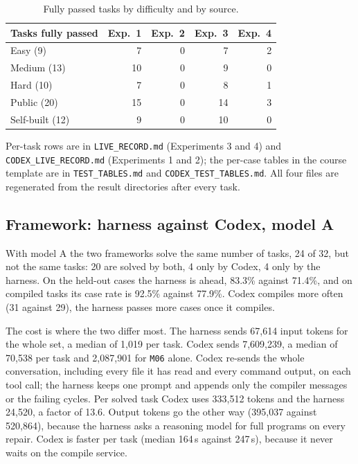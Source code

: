 \begin{table}[h]
\centering
\small
\begin{tabular}{@{}lrrrr@{}}
\toprule
Tasks fully passed & \textbf{Exp.~1} & \textbf{Exp.~2} & \textbf{Exp.~3} & \textbf{Exp.~4} \\
\midrule
Easy (9)       & 7 & 0 & 7 & 2 \\
Medium (13)    & 10 & 0 & 9 & 0 \\
Hard (10)      & 7 & 0 & 8 & 1 \\
\midrule
Public (20)    & 15 & 0 & 14 & 3 \\
Self-built (12) & 9 & 0 & 10 & 0 \\
\bottomrule
\end{tabular}
\caption{Fully passed tasks by difficulty and by source.}
\end{table}

Per-task rows are in \texttt{LIVE\_RECORD.md} (Experiments 3 and 4) and
\texttt{CODEX\_LIVE\_RECORD.md} (Experiments 1 and 2); the per-case tables in
the course template are in \texttt{TEST\_TABLES.md} and
\texttt{CODEX\_TEST\_TABLES.md}. All four files are regenerated from the result
directories after every task.

\subsection{Framework: harness against Codex, model A}

With model A the two frameworks solve the same number of tasks, 24 of 32, but
not the same tasks: 20 are solved by both, 4 only by Codex, 4 only by the
harness. On the held-out cases the harness is ahead, 83.3\% against 71.4\%, and
on compiled tasks its case rate is 92.5\% against 77.9\%. Codex compiles more
often (31 against 29), the harness passes more cases once it compiles.

The cost is where the two differ most. The harness sends 67{,}614 input tokens
for the whole set, a median of 1{,}019 per task. Codex sends 7{,}609{,}239, a
median of 70{,}538 per task and 2{,}087{,}901 for \texttt{M06} alone. Codex
re-sends the whole conversation, including every file it has read and every
command output, on each tool call; the harness keeps one prompt and appends
only the compiler messages or the failing cycles. Per solved task Codex uses
333{,}512 tokens and the harness 24{,}520, a factor of 13.6. Output tokens go
the other way (395{,}037 against 520{,}864), because the harness asks a
reasoning model for full programs on every repair. Codex is faster per task
(median 164\,s against 247\,s), because it never waits on the compile service.

